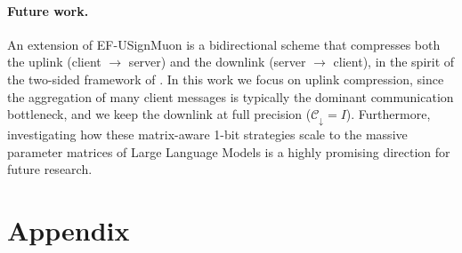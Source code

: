 \documentclass{article}
\begin{document}
\paragraph{Future work.} An extension of EF-USignMuon is a bidirectional scheme that compresses both the uplink (client $\to$ server) and the downlink (server $\to$ client), in the spirit of the two-sided framework of \citet{gruntkowska2025error}. In this work we focus on uplink compression, since the aggregation of many client messages is typically the dominant communication bottleneck, and we keep the downlink at full precision ($\mathcal{C}_{\downarrow} = I$). Furthermore, investigating how these matrix-aware 1-bit strategies scale to the massive parameter matrices of Large Language Models is a highly promising direction for future research.






\newpage




\newpage
\appendix

\section{Appendix}
\end{document}
